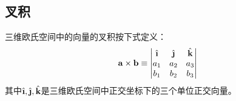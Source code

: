 \begin{definition}
  
\end{definition}


\subsection{叉积}
\label{sec:cross-product-of-vector}
\begin{definition}
  三维欧氏空间中的向量的叉积按下式定义：
  \begin{align*}
    \vec{a}\times\vec{b}\equiv
    \begin{vmatrix}
      \ihat  & \jhat  & \khat\\
      a_1    & a_2    & a_3\\
      b_1    & b_2    & b_3
    \end{vmatrix}
  \end{align*}
  其中$\ihat, \jhat, \khat$是三维欧氏空间中正交坐标下的三个单位正交向量。
\end{definition}

